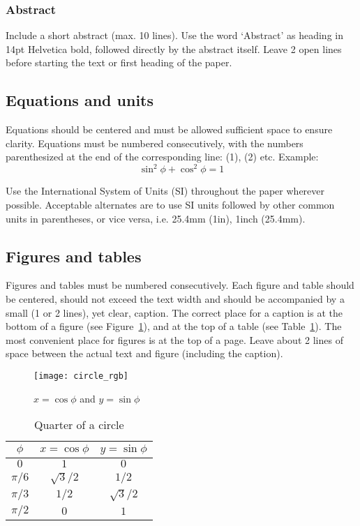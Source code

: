 \documentclass{ISMA_USD2020}
\begin{document}
\subsubsection{Abstract}

Include a short abstract (max. 10 lines). Use the word `Abstract' as heading in 14pt Helvetica bold, followed directly by the abstract itself. Leave 2 open lines before starting the text or first heading of the paper.

\subsection{Equations and units}

Equations should be centered and must be allowed sufficient space to ensure clarity. Equations must be numbered consecutively, with the numbers parenthesized at the end of the corresponding line: (1), (2) etc. Example:
\begin{equation}
\sin^2 \phi + \cos^2 \phi = 1 \label{e:circle}
\end{equation}

Use the International System of Units (SI) throughout the paper wherever possible. Acceptable alternates are to use SI units followed by other common units in parentheses, or vice versa, i.e. 25.4mm (1in), 1inch (25.4mm).

\subsection{Figures and tables}

Figures and tables must be numbered consecutively. Each figure and table should be centered, should not exceed the text width and should be accompanied by a small (1 or 2 lines), yet clear, caption. The correct place for a caption is at the bottom of a figure (see Figure~\ref{f:circle}), and at the top of a table (see Table~\ref{t:circle}). The most convenient place for figures is at the top of a page. Leave about 2 lines of space between the actual text and figure (including the caption).

\begin{figure}[t]
\begin{center}
\texttt{[image: circle\_rgb]}
\caption{$x = \cos \phi$ and $y = \sin \phi$ \label{f:circle}}
\end{center}
\end{figure}

\begin{table}[ht]
\centering
\begin{tabular}{c|cc}
$\phi$   & $x = \cos \phi$ & $y = \sin \phi$ \\
\hline
$0$      &    $1$          &    $0$          \\
$\pi/6$  &  $\sqrt{3}/2$   &    $1/2$        \\
$\pi/3$  &    $1/2$        &  $\sqrt{3}/2$   \\
$\pi/2$  &    $0$          &    $1$
\end{tabular}
\caption{Quarter of a circle \label{t:circle}}
\end{table}
\end{document}
